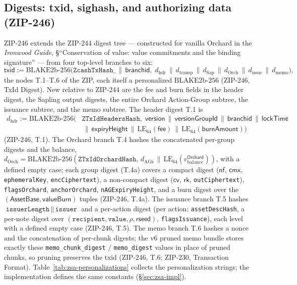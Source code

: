 \documentclass[11pt,a4paper]{article}
\theoremstyle{definition}
\newcommand{\nfsym}{\mathsf{nf}}
\newcommand{\cmx}{\mathsf{cmx}}
\newcommand{\cvsym}{\mathsf{cv}}
\newcommand{\rk}{\mathsf{rk}}
\begin{document}
\subsection{Digests: txid, sighash, and authorizing data (ZIP-246)}
\label{sec:zsa-digests}

ZIP-246 extends the ZIP-244 digest tree --- constructed for vanilla Orchard
in the \emph{Ironwood Guide}, \S``Conservation of value: value commitments and
the binding signature'' --- from four top-level branches to six:
\[
\mathsf{txid} := \mathrm{BLAKE2b\text{-}256}\bigl(\texttt{ZcashTxHash\_}
\,\|\, \mathsf{branchid},\;
d_{\mathrm{hdr}} \,\|\, d_{\mathrm{transp}} \,\|\, d_{\mathrm{Sap}} \,\|\,
d_{\mathrm{Orch}} \,\|\, d_{\mathrm{issue}} \,\|\, d_{\mathrm{memo}}\bigr),
\]
the nodes T.1--T.6 of the ZIP, each itself a personalized
$\mathrm{BLAKE2b\text{-}256}$ (ZIP-246, TxId Digest). New relative to ZIP-244
are the fee and burn fields in the header digest, the Sapling output digests,
the entire Orchard Action-Group subtree, the issuance subtree, and the memo
subtree. The header digest T.1 is
\begin{align*}
d_{\mathrm{hdr}} := \mathrm{BLAKE2b\text{-}256}\bigl(
&\texttt{ZTxIdHeadersHash},\;
\mathsf{version} \,\|\, \mathsf{versionGroupId} \,\|\, \mathsf{branchid}
\,\|\, \mathsf{lockTime} \\
&\,\|\, \mathsf{expiryHeight} \,\|\,
\mathrm{LE}_{64}(\mathsf{fee}) \,\|\, \mathrm{LE}_{64}(\mathsf{burnAmount})
\bigr)
\end{align*}
(ZIP-246, T.1). The Orchard branch T.4 hashes the concatenated per-group
digests and the balance,
$d_{\mathrm{Orch}} = \mathrm{BLAKE2b\text{-}256}(\texttt{ZTxIdOrchardHash},\,
d_{\mathrm{AGs}} \,\|\,
\mathrm{LE}_{64}(v_{\mathrm{balance}}^{\mathsf{Orchard}}))$,
with a defined empty case; each group digest (T.4a) covers a compact digest
($\nfsym$, $\cmx$, \texttt{ephemeralKey}, \texttt{encCiphertext}), a
non-compact digest ($\cvsym$, $\rk$, \texttt{outCiphertext}),
\texttt{flagsOrchard}, \texttt{anchorOrchard}, \texttt{nAGExpiryHeight}, and
a burn digest over the $(\mathsf{AssetBase}, \mathsf{valueBurn})$ tuples
(ZIP-246, T.4a). The issuance branch T.5 hashes
$\texttt{issuerLength} \,\|\, \texttt{issuer}$ and a per-action digest
(per action: \texttt{assetDescHash}, a per-note digest over
$(\texttt{recipient}, \texttt{value}, \rho, \mathsf{rseed})$,
\texttt{flagsIssuance}), each level with a defined empty case (ZIP-246,
T.5). The memo branch T.6 hashes a nonce and the concatenation of per-chunk
digests; the v6 pruned memo bundle stores exactly these
\texttt{memo\_chunk\_digest} / \texttt{memo\_digest} values in place of
pruned chunks, so pruning preserves the txid (ZIP-246, T.6; ZIP-230,
Transaction Format). Table~\ref{tab:zsa-personalizations} collects the
personalization strings; the implementation defines the same constants
(\S\ref{sec:zsa-impl}).
\end{document}
